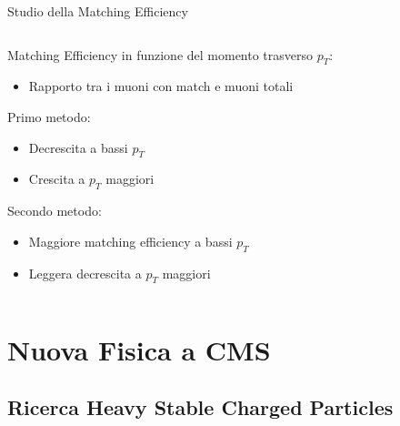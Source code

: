 \documentclass{beamer}
\begin{document}
\begin{frame}{Studio della Matching Efficiency}
\begin{columns}

    \begin{column}{0.55\textwidth}

    Matching Efficiency in funzione del momento trasverso $p_T$:
    \begin{itemize}
        \item Rapporto tra i muoni con match e muoni totali
    \end{itemize}

    \vspace{0.3cm}

    Primo metodo:
    \begin{itemize}
        \item Decrescita a bassi $p_T$
        \item Crescita a $p_T$ maggiori
    \end{itemize}

    Secondo metodo:
    \begin{itemize}
        \item Maggiore matching efficiency a bassi $p_T$
        \item Leggera decrescita a $p_T$ maggiori
    \end{itemize}
        
    \end{column}
    \begin{column}{0.5\textwidth}
        \centering
        \vspace{0.5 cm}
    \end{column}
\end{columns}

\vspace{0.5 cm}

\end{frame}


\section{Nuova Fisica a CMS}
\subsection{Ricerca Heavy Stable Charged Particles}
\end{document}
